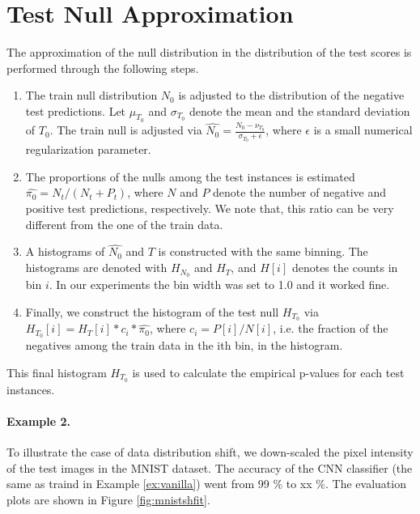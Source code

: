 \documentclass{article}
\begin{document}
\  

\  

\ 
  


\section{Test Null Approximation}

The approximation of the null distribution in the distribution of the test scores is performed through the following steps.


\begin{enumerate}%
    \item The train null distribution $N_0$ is adjusted to the distribution of the negative test predictions. Let $\mu_{T_0}$ and $\sigma_{T_0}$ denote the mean and the standard deviation of $T_0$. The train null is adjusted via $\hat{N_0} = \frac{N_0-\nu_{T_0}}{\sigma_{T_0}+\epsilon}$, where $\epsilon$ is a small numerical regularization parameter.
    
    \item The proportions of the nulls among the test instances is estimated $\hat{\pi_0}=N_t/(N_t+P_t)$, where $N$ and $P$ denote the  number of negative and positive test predictions, respectively. We note that, this ratio can be very different from the one of the train data. 
    
    \item A histograms of $\hat{N_0}$ and $T$ is constructed with the same binning. The histograms are denoted with $H_{N_0}$ and $H_T$, and $H[i]$ denotes the counts in bin $i$. In our experiments the bin width was set to 1.0 and it worked fine.
    
    \item Finally, we construct the histogram of the test null $H_{T_0}$ via $H_{T_0}[i]= H_T[i]*c_i*\hat{\pi_0}$, where $c_i=P[i]/N[i]$, i.e. the fraction of the negatives among the train data in the ith bin, in the histogram.
    
\end{enumerate}

This final histogram $H_{T_0}$ is used to calculate the empirical p-values for each test instances. 
    

\paragraph{Example 2.} To illustrate the case of data distribution shift, we down-scaled the pixel intensity of the test images in the MNIST dataset. The accuracy of the CNN classifier (the same as traind in Example \ref{ex:vanilla}) went from 99 \% to xx \%. The evaluation plots are shown in Figure \ref{fig:mnistshfit}.
\end{document}
